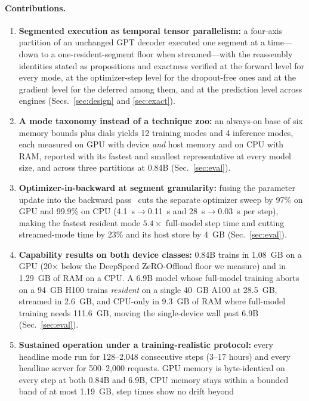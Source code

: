 \documentclass[journal]{IEEEtran}
\begin{document}
\paragraph{Contributions.}
\begin{enumerate}
\item \textbf{Segmented execution as temporal tensor parallelism:} a
  four-axis partition of an unchanged GPT decoder executed one segment at
  a time---down to a one-resident-segment floor when streamed---with the
  reassembly identities stated as
  propositions and exactness verified at the forward level for every mode, at
  the optimizer-step level for the dropout-free ones and at the gradient level
  for the deferred among them, and at the prediction level across engines
  (Secs.~\ref{sec:design} and \ref{sec:exact}).
\item \textbf{A mode taxonomy instead of a technique zoo:} an always-on base
  of six memory bounds plus dials yields 12 training modes and 4 inference
  modes, each measured on GPU with device \emph{and} host memory and on CPU
  with RAM, reported with its fastest and smallest representative at every
  model size, and across three partitions at 0.84B (Sec.~\ref{sec:eval}).
\item \textbf{Optimizer-in-backward at segment granularity:} fusing the
  parameter update into the backward pass~\cite{lv2024lomo} cuts the
  separate optimizer sweep by 97\% on GPU and 99.9\% on CPU
  (4.1~s${\to}$0.11~s and 28~s${\to}$0.03~s per step), making the fastest resident mode $5.4\times$
  full-model step time and cutting streamed-mode time by 23\% and its host
  store by 4~GB (Sec.~\ref{sec:eval}).
\item \textbf{Capability results on both device classes:} 0.84B trains in
  1.08~GB on a GPU (20$\times$ below the DeepSpeed ZeRO-Offload floor we
  measure) and in 1.29~GB of RAM on a CPU. A 6.9B model whose full-model
  training aborts on a 94~GB H100 trains \emph{resident} on a single 40~GB
  A100 at 28.5~GB, streamed in 2.6~GB, and CPU-only in 9.3~GB of RAM where
  full-model training needs 111.6~GB, moving the single-device wall past
  6.9B (Sec.~\ref{sec:eval}).
\item \textbf{Sustained operation under a training-realistic protocol:}
  every headline mode run for 128--2{,}048 consecutive steps (3--17 hours)
  and every headline server for 500--2{,}000 requests. GPU memory is
  byte-identical on every step at both 0.84B and 6.9B, CPU memory stays within a
  bounded band of at most 1.19~GB, step times show no drift beyond

\end{enumerate}
\end{document}
